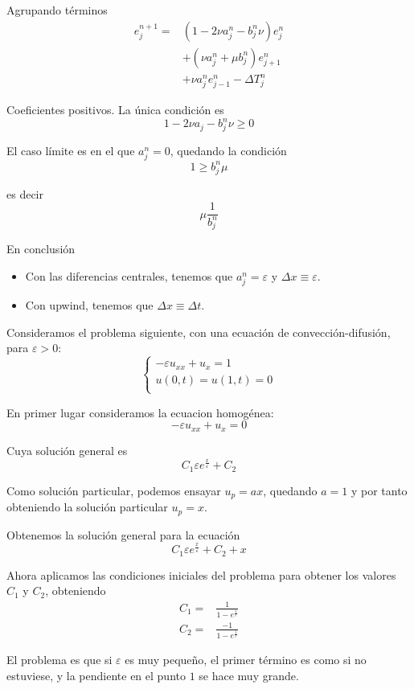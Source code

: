 Agrupando términos
\begin{align*}
	e_j^{n+1} = & (1-2\nu a_j^n - b_j^n\nu)e_j^n\\
	& + (\nu a_j^n + \mu b_j^n)e_{j+1}^n\\
	& + \nu a_j^n e_{j-1}^n - \Delta T_j^n
\end{align*}

Coeficientes positivos. La única condición es
$$1-2\nu a_j -  b_j^n \nu \ge 0$$

El caso límite es en el que $a_j^n = 0$, quedando la condición 
$$1\ge b_j^n \mu$$

es decir
$$\mu\frac{1}{b_j^n}$$

En conclusión
\begin{itemize}
	\vspace{-3mm}
	\item Con las diferencias centrales, tenemos que $a_j^n = \varepsilon$ y $\Delta x \equiv \varepsilon$.
	\item Con upwind, tenemos que $\Delta x \equiv \Delta t$.
\end{itemize}

\begin{example}
	Consideramos el problema siguiente, con una ecuación de convección-difusión, para $\varepsilon > 0$:
	\begin{equation*}
		\left\{
		\begin{array}{l}
			-\varepsilon u_{xx} + u_x = 1\\
			u(0,t) = u(1,t) = 0\\
		\end{array}
		\right.
	\end{equation*}
	
	En primer lugar consideramos la ecuacion homogénea:
	$$-\varepsilon u_{xx} + u_x = 0$$
	
	Cuya solución general es $$C_1\varepsilon e^{\frac{x}{\varepsilon}} + C_2$$
	
	Como solución particular, podemos ensayar $u_p = ax$, quedando $a=1$ y por tanto obteniendo la solución particular $u_p = x$.
	
	Obtenemos la solución general para la ecuación
	$$C_1\varepsilon e^{\frac{x}{\varepsilon}} + C_2 + x$$
	
	Ahora aplicamos las condiciones iniciales del problema para obtener los valores $C_1$ y $C_2$, obteniendo
	\begin{align*}
		C_1 = & \frac{1}{1-e^{\frac{1}{\varepsilon}}}\\
		C_2 = & \frac{-1}{1-e^{\frac{1}{\varepsilon}}}
	\end{align*}
	
	El problema es que si $\varepsilon$ es muy pequeño, el primer término es como si no estuviese, y la pendiente en el punto $1$ se hace muy grande.
\end{example}


